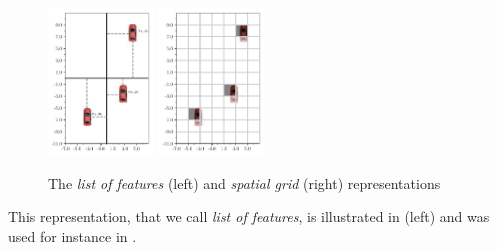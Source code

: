 \begin{figure}[tp]
	\centering
	\includegraphics[width=0.25\textwidth]{img/coordinates}
	\includegraphics[width=0.25\textwidth]{img/map}
	\caption{The \emph{list of features} (left) and \emph{spatial grid} (right) representations}
	\label{fig:representation}
\end{figure}

This representation, that we call \emph{list of features}, is illustrated in  (left) and was used for instance in \citep{Bai2015, Gindele2015, Song2016, Sunberg2017, Paxton2017, Galceran2017, Chen2017}.


